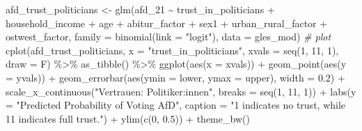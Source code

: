 \documentclass[
]{article}
\newenvironment{Shaded}{\begin{snugshade}}{\end{snugshade}}
\newcommand{\AttributeTok}[1]{\textcolor[rgb]{0.77,0.63,0.00}{#1}}
\newcommand{\CommentTok}[1]{\textcolor[rgb]{0.56,0.35,0.01}{\textit{#1}}}
\newcommand{\DecValTok}[1]{\textcolor[rgb]{0.00,0.00,0.81}{#1}}
\newcommand{\FloatTok}[1]{\textcolor[rgb]{0.00,0.00,0.81}{#1}}
\newcommand{\FunctionTok}[1]{\textcolor[rgb]{0.00,0.00,0.00}{#1}}
\newcommand{\NormalTok}[1]{#1}
\newcommand{\OtherTok}[1]{\textcolor[rgb]{0.56,0.35,0.01}{#1}}
\newcommand{\SpecialCharTok}[1]{\textcolor[rgb]{0.00,0.00,0.00}{#1}}
\newcommand{\StringTok}[1]{\textcolor[rgb]{0.31,0.60,0.02}{#1}}
\begin{document}
\begin{Shaded}
\begin{Highlighting}[]
\NormalTok{afd\_trust\_politicians }\OtherTok{\textless{}{-}} \FunctionTok{glm}\NormalTok{(afd\_21 }\SpecialCharTok{\textasciitilde{}}\NormalTok{ trust\_in\_politicians }\SpecialCharTok{+}\NormalTok{ household\_income }\SpecialCharTok{+}\NormalTok{ age }\SpecialCharTok{+}\NormalTok{ abitur\_factor }\SpecialCharTok{+}\NormalTok{ sex1 }\SpecialCharTok{+}\NormalTok{ urban\_rural\_factor }\SpecialCharTok{+}\NormalTok{ ostwest\_factor, }\AttributeTok{family =} \FunctionTok{binomial}\NormalTok{(}\AttributeTok{link =} \StringTok{"logit"}\NormalTok{), }\AttributeTok{data =}\NormalTok{ gles\_mod)}
\CommentTok{\# plot }
\FunctionTok{cplot}\NormalTok{(afd\_trust\_politicians, }\AttributeTok{x =} \StringTok{"trust\_in\_politicians"}\NormalTok{,}
      \AttributeTok{xvals =} \FunctionTok{seq}\NormalTok{(}\DecValTok{1}\NormalTok{, }\DecValTok{11}\NormalTok{, }\DecValTok{1}\NormalTok{), }\AttributeTok{draw =}\NormalTok{ F)  }\SpecialCharTok{\%\textgreater{}\%}
  \FunctionTok{as\_tibble}\NormalTok{() }\SpecialCharTok{\%\textgreater{}\%}
  \FunctionTok{ggplot}\NormalTok{(}\FunctionTok{aes}\NormalTok{(}\AttributeTok{x =}\NormalTok{ xvals)) }\SpecialCharTok{+}
  \FunctionTok{geom\_point}\NormalTok{(}\FunctionTok{aes}\NormalTok{(}\AttributeTok{y =}\NormalTok{ yvals)) }\SpecialCharTok{+}
  \FunctionTok{geom\_errorbar}\NormalTok{(}\FunctionTok{aes}\NormalTok{(}\AttributeTok{ymin =}\NormalTok{ lower, }\AttributeTok{ymax =}\NormalTok{ upper), }\AttributeTok{width =} \FloatTok{0.2}\NormalTok{) }\SpecialCharTok{+}
  \FunctionTok{scale\_x\_continuous}\NormalTok{(}\StringTok{"Vertrauen: Politiker:innen"}\NormalTok{, }
                     \AttributeTok{breaks =} \FunctionTok{seq}\NormalTok{(}\DecValTok{1}\NormalTok{, }\DecValTok{11}\NormalTok{, }\DecValTok{1}\NormalTok{)) }\SpecialCharTok{+}
  \FunctionTok{labs}\NormalTok{(}\AttributeTok{y =} \StringTok{"Predicted Probability of Voting AfD"}\NormalTok{, }
       \AttributeTok{caption =} \StringTok{"\textquotesingle{}1\textquotesingle{} indicates \textquotesingle{}no trust\textquotesingle{}, while 11 indicates \textquotesingle{}full trust\textquotesingle{}."}\NormalTok{) }\SpecialCharTok{+}
  \FunctionTok{ylim}\NormalTok{(}\FunctionTok{c}\NormalTok{(}\DecValTok{0}\NormalTok{, }\FloatTok{0.5}\NormalTok{)) }\SpecialCharTok{+}
  \FunctionTok{theme\_bw}\NormalTok{()}
\end{Highlighting}
\end{Shaded}
\end{document}
